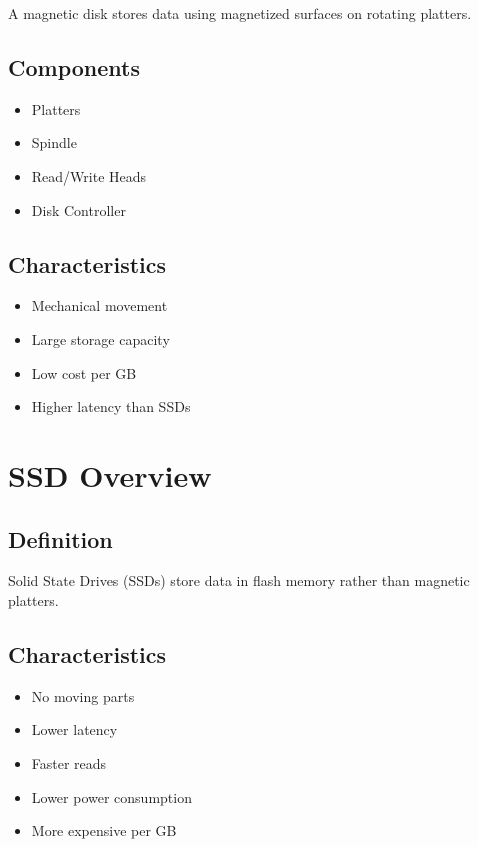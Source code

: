 A magnetic disk stores data using magnetized surfaces on rotating platters.

\subsection{Components}

\begin{itemize}
\item Platters
\item Spindle
\item Read/Write Heads
\item Disk Controller
\end{itemize}

\subsection{Characteristics}

\begin{itemize}
\item Mechanical movement
\item Large storage capacity
\item Low cost per GB
\item Higher latency than SSDs
\end{itemize}

\section{SSD Overview}

\subsection{Definition}

Solid State Drives (SSDs) store data in flash memory rather than magnetic platters.

\subsection{Characteristics}

\begin{itemize}
\item No moving parts
\item Lower latency
\item Faster reads
\item Lower power consumption
\item More expensive per GB
\end{itemize}

